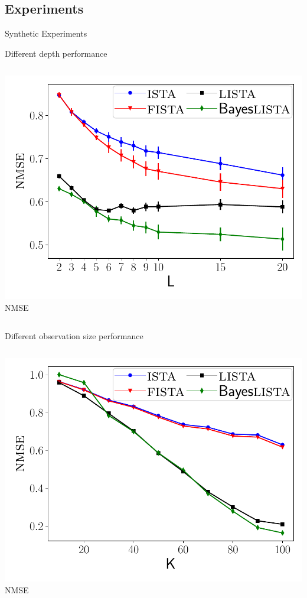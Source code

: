\documentclass[9pt]{beamer}
\begin{document}
\subsection{Experiments}
\begin{frame}{Synthetic Experiments}
  \centering
  \begin{block}{Different depth performance}
    \begin{columns}
      \begin{column}{0.5\textwidth}
        \centering
        \includegraphics[width=0.5\columnwidth]{graphics/synthetic_number_of_layers/nmse_validation} \\
        NMSE
      \end{column}
    \end{columns}
  \end{block}

	\begin{block}{Different observation size performance}
    \begin{columns}
      \begin{column}{0.5\textwidth}
        \centering
        \includegraphics[width=0.5\columnwidth]{graphics/synthetic_undersampling/nmse_validation} \\
        NMSE
      \end{column}
    \end{columns}
  \end{block}
\end{frame}
\end{document}
